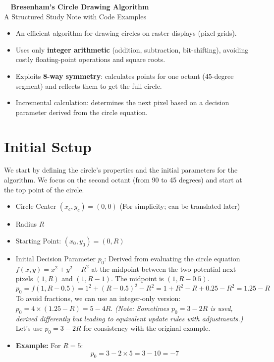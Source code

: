 \documentclass[12pt, a4paper]{article}
\begin{document}
\begin{tcolorbox}[
    colback=RoyalBlue!10!white,
    colframe=RoyalBlue!75!black,
    sharp corners,
    boxrule=1pt,
    center title
    ]
    {\Huge \bfseries \faDotCircle~ Bresenham's Circle Drawing Algorithm} \\[0.2cm]
    {\large A Structured Study Note with Code Examples}
\end{tcolorbox}
\vspace{0.5cm}

\begin{tcolorbox}[
    colback=yellow!10!white,
    colframe=orange!75!black,
    title=\faStickyNote~ Quick Notes,
    fonttitle=\bfseries\large
    ]
    \begin{itemize}
        \item An efficient algorithm for drawing circles on raster displays (pixel grids).
        \item Uses only \textbf{integer arithmetic} (addition, subtraction, bit-shifting), avoiding costly floating-point operations and square roots.
        \item Exploits \textbf{8-way symmetry}: calculates points for one octant (45-degree segment) and reflects them to get the full circle.
        \item Incremental calculation: determines the next pixel based on a decision parameter derived from the circle equation.
    \end{itemize}
\end{tcolorbox}

\section{Initial Setup}
We start by defining the circle's properties and the initial parameters for the algorithm. We focus on the second octant (from 90 to 45 degrees) and start at the top point of the circle.
\begin{itemize}
    \item Circle Center $(x_c, y_c) = (0, 0)$ (For simplicity; can be translated later)
    \item Radius $R$
    \item Starting Point: $(x_0, y_0) = (0, R)$
    \item Initial Decision Parameter $p_0$: Derived from evaluating the circle equation $f(x, y) = x^2 + y^2 - R^2$ at the midpoint between the two potential next pixels $(1, R)$ and $(1, R-1)$. The midpoint is $(1, R - 0.5)$.
    \[
        p_0 = f(1, R - 0.5) = 1^2 + (R - 0.5)^2 - R^2 = 1 + R^2 - R + 0.25 - R^2 = 1.25 - R
    \]
    To avoid fractions, we can use an integer-only version: $p_0 = 4 \times (1.25 - R) = 5 - 4R$.
    \textit{(Note: Sometimes $p_0 = 3 - 2R$ is used, derived differently but leading to equivalent update rules with adjustments.)} Let's use $p_0 = 3 - 2R$ for consistency with the original example.
    \item \textbf{Example:} For $R = 5$:
    \[
        p_0 = 3 - 2 \times 5 = 3 - 10 = -7
    \]
\end{itemize}
\end{document}
